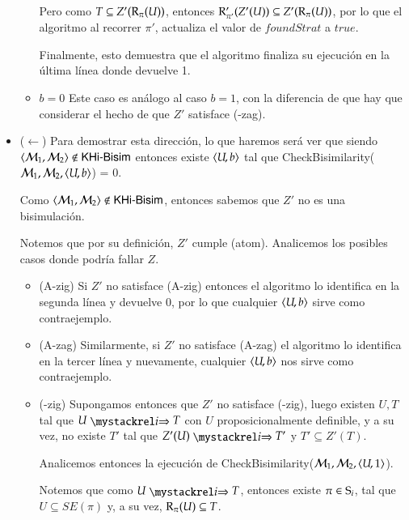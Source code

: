 \begin{demostracion}
\begin{itemize}
\begin{itemize}
                Pero como $T \subseteq Z'(\R_\pi(U))$, entonces $\R'_{\pi'}(Z'(U)) \subseteq Z'(\R_\pi(U))$, por lo que 
                el algoritmo al recorrer $\pi'$, actualiza el valor de $foundStrat$ a $true$.
                
                Finalmente, esto demuestra que el algoritmo finaliza su ejecución en la última línea donde devuelve 1.
            \item $b = 0$
                Este caso es análogo al caso $b = 1$, con la diferencia de que hay que considerar el hecho de que 
                $Z'$ satisface (\KHilogic-zag).
        \end{itemize}

        \item ($\leftarrow$) Para demostrar esta dirección, lo que haremos será ver que siendo 
        $\tup{\modults_1,\modults_2} \not \in \KHiBisim$ entonces
        existe $\tup{U,b}$ tal que CheckBisimilarity($\modults_1,\modults_2,\tup{U,b}$) = 0.  
        
        Como $\tup{\modults_1,\modults_2} \not \in \KHiBisim$, entonces sabemos que $Z'$ no es una bisimulación.

        Notemos que por su definición, $Z'$ cumple (atom). Analicemos los posibles casos donde podría fallar $Z$.

        \begin{itemize}
            \item (A-zig) Si $Z'$ no satisface (A-zig) entonces el algoritmo lo identifica en la segunda línea y devuelve 0, 
            por lo que cualquier $\tup{U,b}$ sirve como contraejemplo.
            \item (A-zag) Similarmente, si $Z'$ no satisface (A-zag) el algoritmo lo identifica en la tercer línea y 
            nuevamente, cualquier $\tup{U,b}$ nos sirve como contraejemplo.
            \item (\KHilogic-zig) Supongamos entonces que $Z'$ no satisface (\KHilogic-zig), luego existen $U, T$ tal que
            $U \ultsExecAgi T$ con $U$ proposicionalmente definible, y a su vez, no existe $T'$ tal que $Z'(U) \ultsExecAgi T'$ y 
            $T' \subseteq Z'(T)$.

            Analicemos entonces la ejecución de CheckBisimilarity($\modults_1,\modults_2,\tup{U,1}$).

            Notemos que como $U \ultsExecAgi T$, entonces existe $\pi \in \S_i$, tal que $U \subseteq SE(\pi)$ y, 
            a su vez, $\R_\pi(U) \subseteq T$. 


\end{itemize}
\end{itemize}
\end{demostracion}
